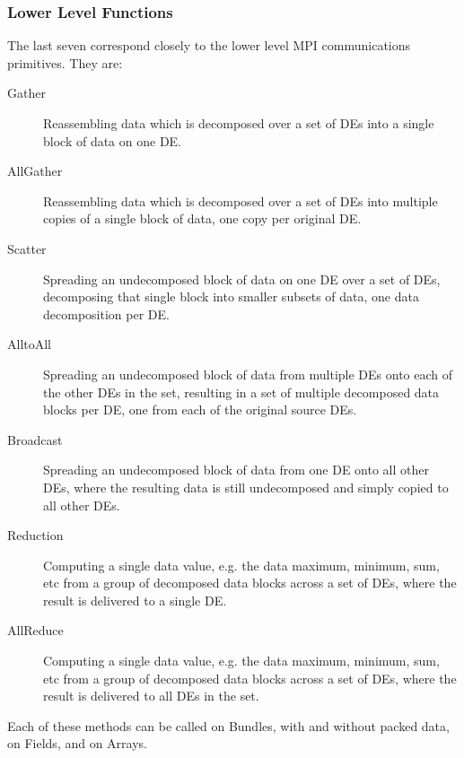\subsubsection{Lower Level Functions}
The last seven correspond closely to the lower level
MPI communications primitives.  They are:
\begin{description}
\item[Gather]
Reassembling data which is decomposed over a set of DEs into a single
block of data on one DE.
\item[AllGather]
Reassembling data which is decomposed over a set of DEs into multiple
copies of a single block of data, one copy per original DE.
\item[Scatter]
Spreading an undecomposed block of data on one DE over a set of DEs,
decomposing that single block into smaller subsets of data, one
data decomposition per DE.
\item[AlltoAll]
Spreading an undecomposed block of data from multiple DEs onto
each of the other DEs in the set, resulting in a set of multiple decomposed 
data blocks per DE, one from each of the original source DEs.
\item[Broadcast]
Spreading an undecomposed block of data from one DE onto all other
DEs, where the resulting data is still undecomposed and simply
copied to all other DEs.
\item[Reduction]
Computing a single data value, e.g. the data maximum, minimum, sum, etc
from a group of decomposed data blocks across a set of DEs, where the
result is delivered to a single DE.
\item[AllReduce]
Computing a single data value, e.g. the data maximum, minimum, sum, etc
from a group of decomposed data blocks across a set of DEs, where the
result is delivered to all DEs in the set.
\end{description}

Each of these methods can be called on Bundles, with and without packed
data, on Fields, and on Arrays.

